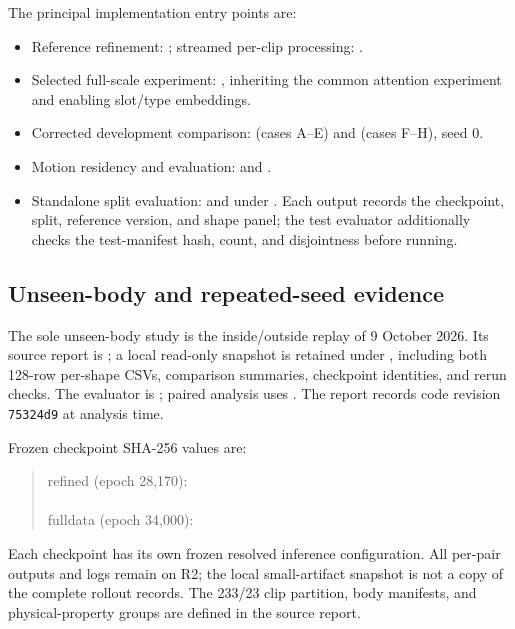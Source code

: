 The principal implementation entry points are:
\begin{itemize}
    \item Reference refinement:
    ; streamed per-clip processing:
    .
    \item Selected full-scale experiment:
    ,
    inheriting the common attention experiment and enabling slot/type embeddings.
    \item Corrected development comparison:
     (cases A--E) and
     (cases F--H), seed 0.
    \item Motion residency and evaluation:
     and
    .
    \item Standalone split evaluation:
     and 
    under . Each output records the checkpoint, split,
    reference version, and shape panel; the test evaluator additionally
    checks the test-manifest hash, count, and disjointness before running.
\end{itemize}

\subsection{Unseen-body and repeated-seed evidence}
The sole unseen-body study is the inside/outside replay of 9 October 2026.
Its source report is ;
a local read-only snapshot is retained under
, including both 128-row
per-shape CSVs, comparison summaries, checkpoint identities, and rerun checks.
The evaluator is ;
paired analysis uses .
The report records code revision \texttt{75324d9} at analysis time.

Frozen checkpoint SHA-256 values are:
\begin{quote}\footnotesize\ttfamily
refined (epoch 28,170):\\
\\
fulldata (epoch 34,000):\\
\end{quote}
Each checkpoint has its own frozen resolved inference configuration.
All per-pair outputs and logs remain on R2; the local small-artifact snapshot
is not a copy of the complete rollout records. The 233/23 clip partition,
body manifests, and physical-property groups are defined in the source report.

